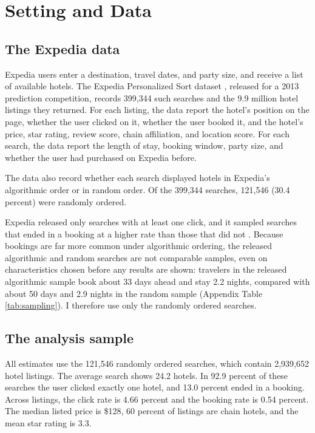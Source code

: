 \documentclass[12pt]{article}
\begin{document}
\section{Setting and Data}

\subsection{The Expedia data}

Expedia users enter a destination, travel dates, and party size, and receive a list of available hotels. The Expedia Personalized Sort dataset \citep{expedia2013}, released for a 2013 prediction competition, records 399,344 such searches and the 9.9 million hotel listings they returned. For each listing, the data report the hotel's position on the page, whether the user clicked on it, whether the user booked it, and the hotel's price, star rating, review score, chain affiliation, and location score. For each search, the data report the length of stay, booking window, party size, and whether the user had purchased on Expedia before.

The data also record whether each search displayed hotels in Expedia's algorithmic order or in random order. Of the 399,344 searches, 121,546 (30.4 percent) were randomly ordered.

Expedia released only searches with at least one click, and it sampled searches that ended in a booking at a higher rate than those that did not \citep[][Section 3.3]{ursu2018power}. Because bookings are far more common under algorithmic ordering, the released algorithmic and random searches are not comparable samples, even on characteristics chosen before any results are shown: travelers in the released algorithmic sample book about 33 days ahead and stay 2.2 nights, compared with about 50 days and 2.9 nights in the random sample (Appendix Table \ref{tab:sampling}). I therefore use only the randomly ordered searches.

\subsection{The analysis sample}

All estimates use the 121,546 randomly ordered searches, which contain 2,939,652 hotel listings. The average search shows 24.2 hotels. In 92.9 percent of these searches the user clicked exactly one hotel, and 13.0 percent ended in a booking. Across listings, the click rate is 4.66 percent and the booking rate is 0.54 percent. The median listed price is \$128, 60 percent of listings are chain hotels, and the mean star rating is 3.3.
\end{document}
